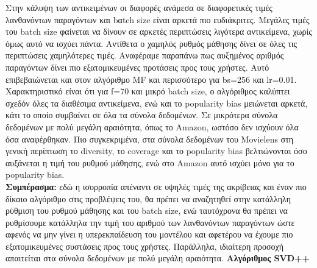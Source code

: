 Στην κάλυψη των αντικειμένων οι διαφορές ανάμεσα σε διαφορετικές τιμές λανθανόντων παραγόντων και bαtch size είναι αρκετά πιο ευδιάκριτες. Μεγάλες τιμές του batch size φαίνεται να δίνουν σε αρκετές περιπτώσεις λιγότερα αντικείμενα, χωρίς όμως αυτό να ισχύει πάντα. Αντίθετα ο χαμηλός ρυθμός μάθησης δίνει σε όλες τις περιπτώσεις χαμηλότερες τιμές.
Αναφέραμε παραπάνω πως αυξημένος αριθμός παραγόντων δίνει πιο εξατομικευμένες προτάσεις προς τους χρήστες. Αυτό επιβεβαιώνεται και στον αλγόριθμο MF και περισσότερο για bs=256 και lr=0.01. Χαρακτηριστικό είναι ότι για f=70 και μικρό batch size, ο αλγόριθμος καλύπτει σχεδόν όλες τα διαθέσιμα αντικείμενα, ενώ και το popularity bias μειώνεται αρκετά, κάτι το οποίο συμβαίνει σε όλα τα σύνολα δεδομένων. Σε μικρότερα σύνολα δεδομένων με πολύ μεγάλη αραιότητα, όπως το Amazon, ωστόσο δεν ισχύουν όλα όσα αναφέρθηκαν. Πιο συγκεκριμένα, στα σύνολα δεδομένων του Movielens στη γενική περίπτωση το diversity, το coverage και το popularity bias βελτιώνονται όσο αυξάνεται η τιμή του ρυθμού μάθησης, ενώ στο Amazon αυτό ισχύει μόνο για το popularity bias.\\
\noindent \textbf{Συμπέρασμα:} εδώ η ισορροπία απέναντι σε υψηλές τιμές της ακρίβειας και έναν πιο δίκαιο αλγόριθμο στις προβλέψεις του, θα πρέπει να αναζητηθεί στην κατάλληλη ρύθμιση του ρυθμού μάθησης και του batch size, ενώ ταυτόχρονα θα πρέπει να ρυθμίσουμε κατάλληλα την τιμή του αριθμού των λανθανόντων παραγόντων ώστε αφενός να μην γίνει η υπερεκπαίδευση του μοντέλου και αφετέρου να έχουμε πιο εξατομικευμένες συστάσεις προς τους χρήστες. Παράλληλα, ιδιαίτερη προσοχή απαιτείται στα σύνολα δεδομένων με πολύ μεγάλη αραιότητα. \newpage
 \noindent\textbf{Αλγόριθμος SVD++}
